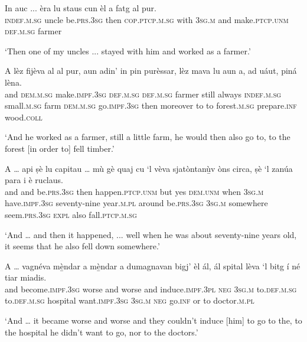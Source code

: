 \begin{linenumbers}
\gll  In auc ... èra lu staus cun èl a fatg al pur.  \\
 \textsc{indef.m.sg} uncle {} be.\textsc{prs.3sg} then \textsc{cop.ptcp.m.sg} with \textsc{3sg.m} and make.\textsc{ptcp.unm} \textsc{def.m.sg} farmer\\
\end{linenumbers}
\medskip
\glt `Then one of my uncles ... stayed with him and worked as a farmer.'
\medskip

\begin{linenumbers}
\gll  A lèz fijèva al al pur, aun adin’ in pin purèssar, lèz mava lu aun a, ad uáut, piná lèna.  \\
and \textsc{dem.m.sg} make.\textsc{impf.3sg} \textsc{def.m.sg} \textsc{def.m.sg} farmer still always \textsc{indef.m.sg} small.\textsc{m.sg} farm \textsc{dem.m.sg} go.\textsc{impf.3sg} then moreover to to forest.\textsc{m.sg} prepare.\textsc{inf} wood.\textsc{coll}\\
\end{linenumbers}
\medskip
\glt `And he worked as a farmer, still a little farm, he would then also go to, to the forest [in order to] fell timber.'
\medskip

\begin{linenumbers}
\gll  A … api ṣè lu capitau … mù gè quaj cu `l vèva sjatòntanù̱v òns circa, ṣè `l zanúa para i è ruclaus.  \\
and {} and be.\textsc{prs.3sg} then happen.\textsc{ptcp.unm} {} but yes \textsc{dem.unm} when \textsc{3sg.m} have.\textsc{impf.3sg} seventy-nine year.\textsc{m.pl} around be.\textsc{prs.3sg} \textsc{3sg.m} somewhere  seem.\textsc{prs.3sg} \textsc{expl} also fall.\textsc{ptcp.m.sg}\\
\end{linenumbers}
\medskip
\glt `And … and then it happened, ... well when he was about seventy-nine years old, it seems that he also fell down somewhere.'
\medskip

\begin{linenumbers}
\gll  A … vagnéva mè̱ndar a mè̱ndar a dumagnavan bigj' èl ál, ál spital lèva `l bitg í né tiar miadis.  \\
and {}  become.\textsc{impf.3sg} worse and worse and induce.\textsc{impf.3pl} \textsc{neg} \textsc{3sg.m} to.\textsc{def.m.sg} to.\textsc{def.m.sg} hospital want.\textsc{impf.3sg} \textsc{3sg.m} \textsc{neg} go.\textsc{inf} or to doctor.\textsc{m.pl} \\
\end{linenumbers}
\medskip
\glt `And … it became worse and worse and they couldn’t induce [him] to go to the, to the hospital he didn’t want to go, nor to the doctors.'
\medskip

